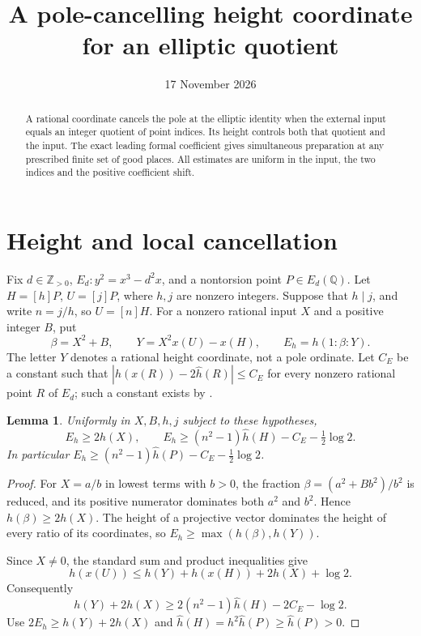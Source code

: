 \documentclass[11pt,a4paper]{article}
\title{A pole-cancelling height coordinate for an elliptic quotient}
\author{}\date{17 November 2026}
\newtheorem{lemma}[theorem]{Lemma}
\newcommand{\Q}{\mathbb Q}\newcommand{\Z}{\mathbb Z}
\begin{document}
\maketitle

\begin{abstract}
A rational coordinate cancels the pole at the elliptic identity when
the external input equals an integer quotient of point indices. Its
height controls both that quotient and the input. The exact leading
formal coefficient gives simultaneous preparation at any prescribed
finite set of good places. All estimates are uniform in the input,
the two indices and the positive coefficient shift.
\end{abstract}

\section{Height and local cancellation}

Fix $d\in\Z_{>0}$, $E_d:y^2=x^3-d^2x$, and a nontorsion point
$P\in E_d(\Q)$. Let $H=[h]P$, $U=[j]P$, where $h,j$ are
nonzero integers. Suppose that $h\mid j$, and write $n=j/h$, so
$U=[n]H$. For a nonzero rational input $X$ and a positive integer
$B$, put
\[
 \beta=X^2+B,\qquad
 Y=X^2x(U)-x(H),\qquad
 E_h=h(1:\beta:Y).
\]
The letter $Y$ denotes a rational height coordinate, not a pole
ordinate. Let $C_E$ be a constant such that
$|h(x(R))-2\widehat h(R)|\le C_E$ for every nonzero rational
point $R$ of $E_d$; such a constant exists by
\cite[Chapter VIII, Section 9]{AEC}.

\begin{lemma}\label{lem:height}
Uniformly in $X,B,h,j$ subject to these hypotheses,
\[
 E_h\ge2h(X),\qquad
 E_h\ge(n^2-1)\widehat h(H)-C_E-\tfrac12\log2.
\]
In particular
$E_h\ge(n^2-1)\widehat h(P)-C_E-\tfrac12\log2$.
\end{lemma}
\begin{proof}
For $X=a/b$ in lowest terms with $b>0$, the fraction
$\beta=(a^2+Bb^2)/b^2$ is reduced, and its positive numerator
dominates both $a^2$ and $b^2$. Hence $h(\beta)\ge2h(X)$.
The height of a projective vector dominates the height of every
ratio of its coordinates, so $E_h\ge\max(h(\beta),h(Y))$.

Since $X\ne0$, the standard sum and product inequalities give
\[
 h(x(U))\le h(Y)+h(x(H))+2h(X)+\log2.
\]
Consequently
\[
 h(Y)+2h(X)\ge2(n^2-1)\widehat h(H)-2C_E-\log2.
\]
Use $2E_h\ge h(Y)+2h(X)$ and
$\widehat h(H)=h^2\widehat h(P)\ge\widehat h(P)>0$.
\end{proof}
\end{document}
